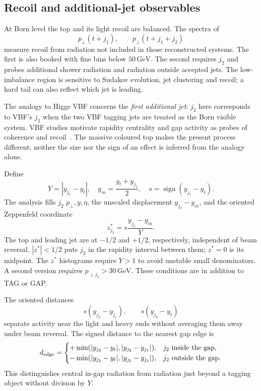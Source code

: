 \documentclass[11pt,a4paper]{article}
\newcommand{\GeV}{\,\mathrm{GeV}}
\begin{document}
\subsection{Recoil and additional-jet observables}

At Born level the top and its light recoil are balanced. The spectra of
\begin{equation}
 p_\perp(t+j_1),\qquad
 p_\perp(t+j_1+j_2)
\end{equation}
measure recoil from radiation not included in those reconstructed systems.
The first is also booked with fine bins below $50\GeV$. The second requires
$j_2$ and probes additional shower radiation and radiation outside accepted
jets. The low-imbalance region is sensitive to Sudakov evolution, jet
clustering and recoil; a hard tail can also reflect which jet is leading.

The analogy to Higgs VBF concerns the \emph{first additional jet}: $j_2$
here corresponds to VBF's $j_3$ when the two VBF tagging jets are treated
as the Born visible system. VBF studies motivate rapidity centrality and
gap activity as probes of coherence and recoil~\cite{VBFJager,VBFHoche}.
The massive coloured top makes the present process different; neither the
size nor the sign of an effect is inferred from the analogy alone.

Define
\begin{equation}
 Y=|y_{j_1}-y_t|,\quad
 y_m=\frac{y_t+y_{j_1}}2,\quad
 s=\operatorname{sign}(y_{j_1}-y_t).
\end{equation}
The analysis fills $j_2$ $p_\perp,y,\eta$, the unscaled displacement
$y_{j_2}-y_m$, and the oriented Zeppenfeld coordinate
\begin{equation}
 z^*_{j_2}=s\frac{y_{j_2}-y_m}{Y}.\label{eq:zstar}
\end{equation}
The top and leading jet are at $-1/2$ and $+1/2$, respectively, independent
of beam reversal. $|z^*|<1/2$ puts $j_2$ in the rapidity interval between
them; $z^*=0$ is its midpoint. The $z^*$ histograms require $Y>1$ to avoid
unstable small denominators. A second version requires
$p_{\perp j_2}>30\GeV$. These conditions are in addition to TAG or GAP.

The oriented distances
\begin{equation}
 s(y_{j_2}-y_{j_1}),\qquad s(y_{j_2}-y_t)
\end{equation}
separate activity near the light and heavy ends without averaging them away
under beam reversal. The signed distance to the nearest gap edge is
\begin{equation}
 d_{\rm edge}=\begin{cases}
 +\min(|y_{j_2}-y_t|,|y_{j_2}-y_{j_1}|),&j_2\text{ inside the gap},\\
 -\min(|y_{j_2}-y_t|,|y_{j_2}-y_{j_1}|),&j_2\text{ outside the gap}.
 \end{cases}
\end{equation}
This distinguishes central in-gap radiation from radiation just beyond a
tagging object without division by $Y$.
\end{document}
